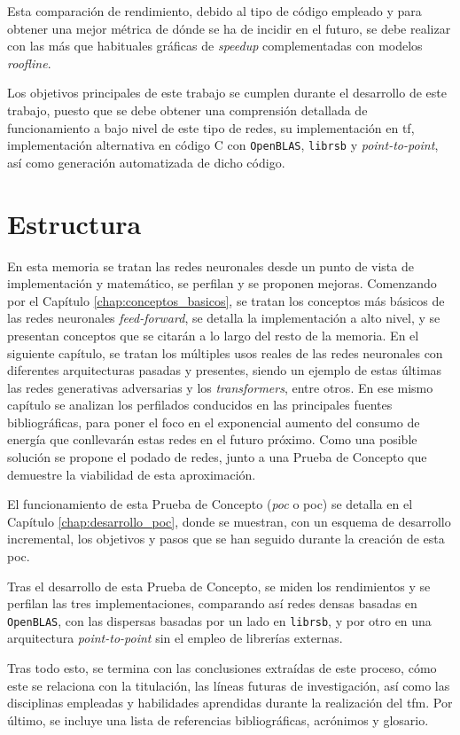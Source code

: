 Esta comparación de rendimiento, debido al tipo de código empleado y para obtener una mejor métrica de dónde se ha de incidir en el futuro, se debe realizar con las más que habituales gráficas de \textit{speedup} complementadas con modelos \textit{roofline}.

Los objetivos principales de este trabajo se cumplen durante el desarrollo de este trabajo, puesto que se debe obtener una comprensión detallada de funcionamiento a bajo nivel de este tipo de redes, su implementación en \acrlong{tf}, implementación alternativa en código C con \texttt{OpenBLAS}, \texttt{librsb} y \textit{point-to-point}, así como generación automatizada de dicho código.

\section{Estructura}
\label{sec:estructura}
En esta memoria se tratan las redes neuronales desde un punto de vista de implementación y matemático, se perfilan y se proponen mejoras. Comenzando por el Capítulo \ref{chap:conceptos_basicos}, se tratan los conceptos más básicos de las redes neuronales \textit{feed-forward}, se detalla la implementación a alto nivel, y se presentan conceptos que se citarán a lo largo del resto de la memoria. En el siguiente capítulo, se tratan los múltiples usos reales de las redes neuronales con diferentes arquitecturas pasadas y presentes, siendo un ejemplo de estas últimas las redes generativas adversarias y los \textit{transformers}, entre otros. En ese mismo capítulo se analizan los perfilados conducidos en las principales fuentes bibliográficas, para poner el foco en el exponencial aumento del consumo de energía que conllevarán estas redes en el futuro próximo. Como una posible solución se propone el podado de redes, junto a una Prueba de Concepto que demuestre la viabilidad de esta aproximación.

El funcionamiento de esta Prueba de Concepto (\textit{\acrlong{poc}} o \acrshort{poc}) se detalla en el Capítulo \ref{chap:desarrollo_poc}, donde se muestran, con un esquema de desarrollo incremental, los objetivos y pasos que se han seguido durante la creación de esta \acrshort{poc}.

Tras el desarrollo de esta Prueba de Concepto, se miden los rendimientos y se perfilan las tres implementaciones, comparando así redes densas basadas en \texttt{OpenBLAS}, con las dispersas basadas por un lado en \texttt{librsb}, y por otro en una arquitectura \textit{point-to-point} sin el empleo de librerías externas.

Tras todo esto, se termina con las conclusiones extraídas de este proceso, cómo este se relaciona con la titulación, las líneas futuras de investigación, así como las disciplinas empleadas y habilidades aprendidas durante la realización del \acrshort{tfm}. Por último, se incluye una lista de referencias bibliográficas, acrónimos y glosario.
